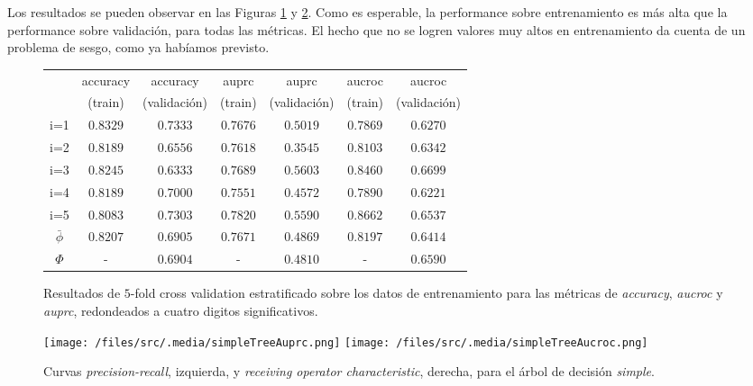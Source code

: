 Los resultados se pueden observar en las Figuras \ref{metricas_simple} y \ref{curvas_simple}. Como es esperable, la performance sobre entrenamiento es más alta que la performance sobre validación, para todas las métricas. El hecho que no se logren valores muy altos en entrenamiento da cuenta de un problema de sesgo, como ya habíamos previsto.

\vspace{0.5em}
\begin{figure}[!htbp]
\begin{center}
\begin{tabular}{ |c|c|c|c|c|c|c| } 
\hline
            & accuracy  & accuracy      & auprc     & auprc         & aucroc   & aucroc      \\
            & (train)   & (validación)  & (train)   & (validación)  & (train)   & (validación) \\      
\hline
i=1         & $0.8329$  & $0.7333$      & $0.7676$  & $0.5019$      & $0.7869$  & $0.6270$ \\
i=2         & $0.8189$  & $0.6556$      & $0.7618$  & $0.3545$      & $0.8103$  & $0.6342$ \\
i=3         & $0.8245$  & $0.6333$      & $0.7689$  & $0.5603$      & $0.8460$  & $0.6699$ \\
i=4         & $0.8189$  & $0.7000$      & $0.7551$  & $0.4572$      & $0.7890$  & $0.6221$ \\
i=5         & $0.8083$  & $0.7303$      & $0.7820$  & $0.5590$      & $0.8662$  & $0.6537$ \\
$\bar\phi$  & $0.8207$  & $0.6905$      & $0.7671$  & $0.4869$      & $0.8197$  & $0.6414$ \\
$\Phi$      & -         & $0.6904$      & -         & $0.4810$      & -         & $0.6590$ \\
\hline
\end{tabular}
\end{center}
\caption{Resultados de $5$-fold cross validation estratificado sobre los datos de entrenamiento para las métricas de \textit{accuracy}, \textit{aucroc} y \textit{auprc}, redondeados a cuatro digitos significativos.}\label{metricas_simple}
\end{figure}

\begin{figure}[!htbp]
    \centering 
    \texttt{[image: /files/src/.media/simpleTreeAuprc.png]}
    \texttt{[image: /files/src/.media/simpleTreeAucroc.png]}
    \caption{Curvas \textit{precision-recall}, izquierda, y \textit{receiving operator characteristic}, derecha, para el árbol de decisión \textit{simple}.}
    \label{curvas_simple}
\end{figure}

